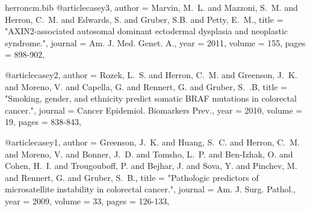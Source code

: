 \documentclass{res}
\begin{document}
\begin{resume}
\begin{filecontents}{herroncm.bib}
@article{casey3,
author = {{Marvin}, M.~L. and {Mazzoni}, S.~M. and {Herron}, C.~M. and {Edwards}, S. and {Gruber}, S.B. and {Petty}, E.~M.},
title = "{AXIN2-associated autosomal dominant ectodermal dysplasia and neoplastic syndrome.}",
journal = {Am. J. Med. Genet. A.},
year = 2011,
volume = 155,
pages = {898-902},
}

@article{casey2,
author = {{Rozek}, L.~S. and {Herron}, C.~M. and {Greenson}, J.~K. and {Moreno}, V. and {Capella}, G. and {Rennert}, G. and {Gruber}, S.~.B},
title =  "{Smoking, gender, and ethnicity predict somatic BRAF mutations in colorectal cancer.}",
journal = {Cancer Epidemiol. Biomarkers Prev.},
year = 2010,
volume = 19,
pages = {838-843},
}

@article{casey1,
author = {{Greenson}, J.~K. and {Huang}, S.~C. and {Herron}, C.~M. and {Moreno}, V. and {Bonner}, J.~D. and {Tomsho}, L.~P. and {Ben-Izhak}, O. and {Cohen}, H.~I. and {Trougouboff}, P. and {Bejhar}, J. and {Sova}, Y. and {Pinchev}, M. and {Rennert}, G. and {Gruber}, S.~B.},
title =  "{Pathologic predictors of microsatellite instability in colorectal cancer.}",
journal = {Am. J. Surg. Pathol.},
year = 2009,
volume = 33,
pages = {126-133},
}
\end{filecontents}

\nocite{*}

\end{resume}
\end{document}
